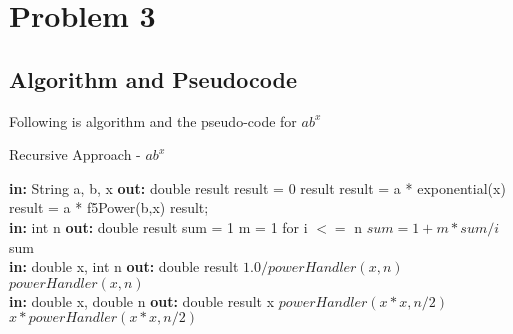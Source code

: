 \documentclass[a4paper,12pt]{article}
\begin{document}
\section{Problem 3}
    \subsection{Algorithm and Pseudocode }
    Following is algorithm and the pseudo-code for $ab^x$
    
    \begin{algorithm}
    \caption{Recursive Approach - $ab^x$ }
    \begin{algorithmic}
    \State \textbf{in: } String a, b, x
    \State \textbf{out: } double result
    \State  result = 0
        \Return result
    \Else {}
     \State result = a * exponential(x)
        \Else 
        \State result = a * f5Power(b,x)
        \EndIf
    \State 
    \Return result;
    \EndIf
    \EndProcedure
    \\
    \State \textbf{in: } int n
    \State \textbf{out: } double result
    \State sum = 1
    \State m = 1
    \State for i $<=$ n 
    \State $sum = 1+m*sum/i$
    \State \Return sum
    \EndProcedure
    \\
    \State \textbf{in: } double x, int n
    \State \textbf{out: } double result
    \State \Return $1.0/powerHandler(x,n)$
        \Else
    \State \Return $powerHandler(x,n)$
    \EndIf
    \EndProcedure
    \\
    \State \textbf{in: } double x, double n
    \State \textbf{out: } double result
    \EndIf
        \Return x
    \EndIf
    \State \Return $powerHandler(x*x,  n/2)$
    \Else
    \State \Return $x * powerHandler(x*x,  n/2)$
    \EndIf
    \EndProcedure
    \end{algorithmic}
    
    \end{algorithm}
    
\end{document}
